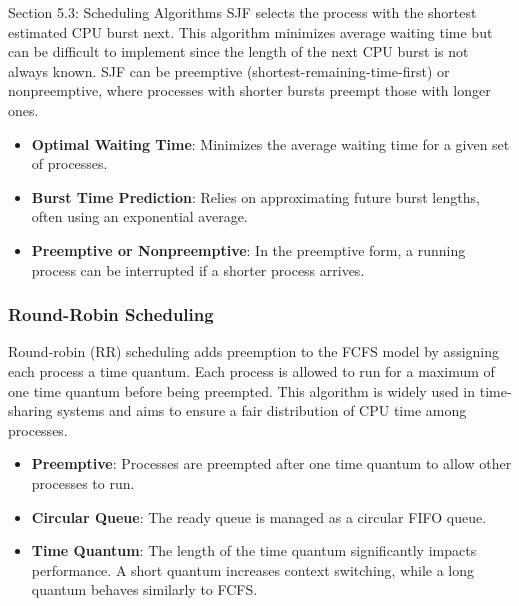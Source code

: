 \begin{notes}{Section 5.3: Scheduling Algorithms}
    SJF selects the process with the shortest estimated CPU burst next. This algorithm minimizes average waiting time but can be difficult to implement since the length of the next CPU burst is not always 
    known. SJF can be preemptive (shortest-remaining-time-first) or nonpreemptive, where processes with shorter bursts preempt those with longer ones.
    
    \begin{highlight}
    
        \begin{itemize}
            \item \textbf{Optimal Waiting Time}: Minimizes the average waiting time for a given set of processes.
            \item \textbf{Burst Time Prediction}: Relies on approximating future burst lengths, often using an exponential average.
            \item \textbf{Preemptive or Nonpreemptive}: In the preemptive form, a running process can be interrupted if a shorter process arrives.
        \end{itemize}
    
    \end{highlight}
    
    \subsubsection*{Round-Robin Scheduling}
    
    Round-robin (RR) scheduling adds preemption to the FCFS model by assigning each process a time quantum. Each process is allowed to run for a maximum of one time quantum before being preempted. This 
    algorithm is widely used in time-sharing systems and aims to ensure a fair distribution of CPU time among processes.
    
    \begin{highlight}
    
        \begin{itemize}
            \item \textbf{Preemptive}: Processes are preempted after one time quantum to allow other processes to run.
            \item \textbf{Circular Queue}: The ready queue is managed as a circular FIFO queue.
            \item \textbf{Time Quantum}: The length of the time quantum significantly impacts performance. A short quantum increases context switching, while a long quantum behaves similarly to FCFS.
        \end{itemize}
    

\end{highlight}
\end{notes}
